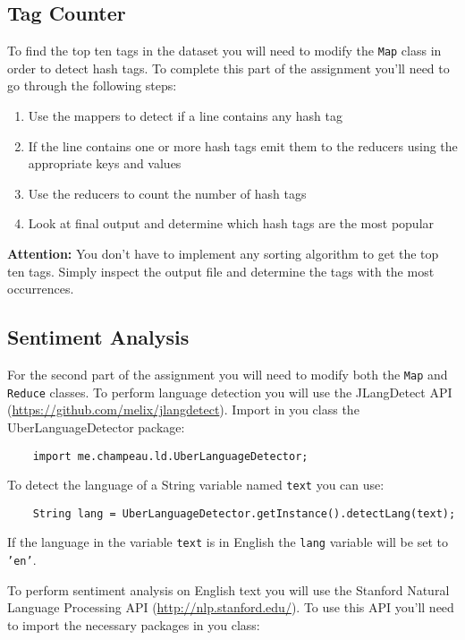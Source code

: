 \documentclass[a4paper,10pt]{article}
\begin{document}
  \subsection{Tag Counter}
  To find the top ten tags in the dataset you will need to modify the \texttt{Map} class in order to detect hash tags. To complete this part of the assignment you'll need to go through the following steps: 
  
  \begin{enumerate}
    \item Use the mappers to detect if a line contains any hash tag
    \item If the line contains one or more hash tags emit them to the reducers using the appropriate keys and values 
    \item Use the reducers to count the number of hash tags 
    \item Look at final output and determine which hash tags are the most popular
  \end{enumerate}
  
  \textbf{Attention:} You don't have to implement any sorting algorithm to get the top ten tags. Simply inspect the output file and determine the tags with the most occurrences. 
  
  \subsection{Sentiment Analysis}
  For the second part of the assignment you will need to modify both the \texttt{Map} and \texttt{Reduce} classes. To perform language detection you will use the JLangDetect API (\url{https://github.com/melix/jlangdetect}). Import in you class the UberLanguageDetector package: 
  
  \lstset{language=Java}      
  \begin{lstlisting}
    import me.champeau.ld.UberLanguageDetector;
  \end{lstlisting}
  
  To detect the language of a String variable named \texttt{text} you can use: 
  
  \begin{lstlisting}
    String lang = UberLanguageDetector.getInstance().detectLang(text);
  \end{lstlisting}
  
  If the language in the variable \texttt{text} is in English the \texttt{lang} variable will be set to \texttt{'en'}. 
  
  To perform sentiment analysis on English text you will use the Stanford Natural Language Processing API (\url{http://nlp.stanford.edu/}). To use this API you'll need to import the necessary packages in you class: 
  
\end{document}
